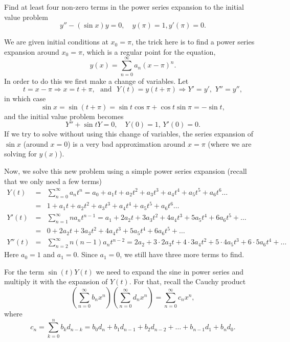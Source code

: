 \documentclass[11pt]{article}
\begin{document}
\begin{problem}
Find at least four non-zero terms in the power series expansion to the initial value problem
\[y''-(\sin x) y = 0, \quad y(\pi)=1, y'(\pi)=0.\]
\end{problem}
\begin{solution}
We are given initial conditions at $x_{0}=\pi$, the trick here is to find a power series expansion around $x_{0}=\pi$, which is a regular point for the equation,
\[y(x)=\sum_{n=0}^{\infty}a_{n}(x-\pi)^{n}.\]
In order to do this we first make a change of variables. Let
\[t=x-\pi \Rightarrow x = t + \pi, \,\, \text{ and } \,\, Y(t)=y(t+\pi) \Rightarrow Y' = y', \,\, Y'' = y'',\]
in which case 
\[\sin x = \sin(t+\pi)=\sin t \cos \pi +\cos t \sin \pi = -\sin t,\]
and the initial value problem becomes
\[Y''+\sin t Y = 0, \quad Y(0)=1,\, Y'(0)=0.\]
If we try to solve without using this change of variables, the series expansion of $\sin x$ (around $x=0$) is a very bad approximation around $x=\pi$ (where we are solving for $y(x)$). 

Now, we solve this new problem using a simple power series expansion (recall that we only need a few terms)
\begin{eqnarray*}
Y(t)&=&\sum_{n=0}^{\infty}a_{n}t^{n}=a_{0}+a_{1}t+a_{2}t^{2}+a_{3}t^{3}+a_{4}t^{4}+a_{5}t^{5}+a_{6}t^{6}\dots\\
    &=&  1+a_{1}t+a_{2}t^{2}+a_{3}t^{3}+a_{4}t^{4}+a_{5}t^{5}+a_{6}t^{6}\dots\\
Y'(t)&=&\sum_{n=1}^{\infty}na_{n}t^{n-1}=a_{1}+2a_{2}t+3a_{3}t^{2}+4a_{4}t^{3}+5a_{5}t^{4}+6a_{6}t^{5}+\dots\\
    &=&  0+2a_{2}t+3a_{3}t^{2}+4a_{4}t^{3}+5a_{5}t^{4}+6a_{6}t^{5}+\dots \\
Y''(t)&=&\sum_{n=2}^{\infty}n(n-1)a_{n}t^{n-2}=2a_{2}+3\cdot2a_{3}t+4\cdot3a_{4}t^{2}+5\cdot4a_{5}t^{3}+6\cdot5a_{6}t^{4}+\dots
\end{eqnarray*}
Here $a_{0}=1$ and $a_{1}=0$. Since $a_{1}=0$, we still have three more terms to find.

For the term $\sin (t) Y(t)$ we need to expand the sine in power series and multiply it with the expansion of $Y(t)$. For that, recall the Cauchy product
\begin{equation*}
\left(\sum_{n=0}^{\infty} b_{n} x^n \right)\left(\sum_{n=0}^{\infty} d_{n} x^n \right) =\sum_{n=0}^{\infty} c_{n} x^n,
\end{equation*}
where
\begin{equation*}
c_{n} = \sum_{k=0}^{n} b_{k} d_{n-k} = b_{0}d_{n}+b_{1}d_{n-1}+b_{2}d_{n-2}+\dots+b_{n-1}d_{1}+b_{n}d_{0}.
\end{equation*}


\end{solution}
\end{document}
